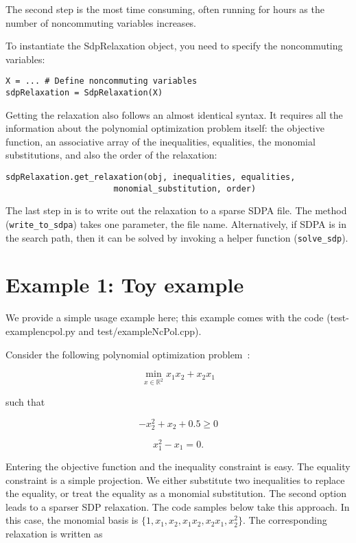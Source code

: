\documentclass{article}
\begin{document}
The second step is the most time consuming, often running for hours as the number of noncommuting variables increases.

To instantiate the SdpRelaxation object, you need to specify the noncommuting variables:
\begin{verbatim}
X = ... # Define noncommuting variables
sdpRelaxation = SdpRelaxation(X)
\end{verbatim}

Getting the relaxation also follows an almost identical syntax. It requires all the information about the polynomial optimization problem itself: the objective function, an associative array of the inequalities, equalities, the monomial substitutions, and also the order of the relaxation:
\begin{verbatim}
sdpRelaxation.get_relaxation(obj, inequalities, equalities, 
                      monomial_substitution, order)
\end{verbatim}

The last step in is to write out the relaxation to a sparse SDPA file. The method (\verb+write_to_sdpa+) takes one parameter, the file name. Alternatively, if SDPA is in the search path, then it can be solved by invoking a helper function (\verb+solve_sdp+).

\section{Example 1: Toy example}
We provide a simple usage example here; this example comes with the code (test-examplencpol.py and test/exampleNcPol.cpp).

Consider the following polynomial optimization problem~\citep{pironio2010convergent}:

\[ \min_{x\in \mathbb{R}^2}x_1x_2+x_2x_1\]

such that

\[ -x_2^2+x_2+0.5\geq 0\]

\[x_1^2-x_1=0.\]


Entering the objective function and the inequality constraint is easy. The equality constraint is a simple projection. We either substitute two inequalities to replace the equality, or treat the equality as a monomial substitution. The second option leads to a sparser SDP relaxation. The code samples below take this approach. In this case, the monomial basis is $\{1, x_1, x_2, x_1x_2, x_2x_1, x_2^2\}$. The corresponding relaxation is written as
\end{document}
